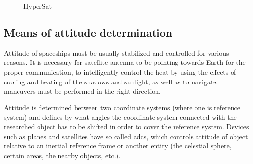 \documentclass[12pt,a4paper,twoside]{article}
\begin{document}
\begin{figure}[!htbp]
  \centering
  \hfill
  \hfill
  \caption{HyperSat}
  \label{fig:hypersat-examples}
\end{figure}

\subsection{Means of attitude determination}

Attitude of spaceships must be usually stabilized and controlled for various reasons.
It is necessary for satellite antenna to be pointing towards Earth for the proper communication, to intelligently control the heat by using the effects of cooling and heating of the shadows and sunlight, as well as to navigate: maneuvers must be performed in the right direction.

Attitude is determined between two coordinate systems (where one is reference system) and defines by what angles the coordinate system connected with the researched object has to be shifted in order to cover the reference system.
Devices such as planes and satellites have so called \gls{adcs}, which controls attitude of object relative to an inertial reference frame or another entity (the celestial sphere, certain areas, the nearby objects, etc.).
\end{document}
